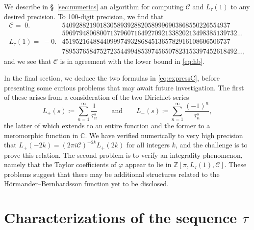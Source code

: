 \documentclass[12pt]{amsart}
\theoremstyle{plain}
\numberwithin{equation}{section}
\theoremstyle{definition}
\newcommand{\Z}{\mathbb{Z}}
\newcommand{\Cone}{\mathscr{C}}
\begin{document}
We describe in \S~\ref{sec:numerics} an algorithm for computing $\Cone$ and $L_{\tau}(1)$ to any desired precision. To 100-digit precision, we find that 
\begin{equation} \label{eq:precise100}
\begin{aligned}
	\Cone =\;
	0.&5409288219018305893928820589996903868550226554937\\
	&596979480680071379607164927092133820213498385139732\ldots\\
	L_{\tau}(1) =\;
	{-}0.&4519521648844099974932868451365782916108606506737\\
	&789537658475272354499485397456507823153397452618492\ldots,
	\end{aligned}
\end{equation}
and we see that $\Cone$ is in agreement with the lower bound in \eqref{eq:hb}. 

In the final section, we deduce the two formulas in \eqref{eq:expressC}, before presenting some curious problems that may await future investigation. The first of these arises from a consideration of the two Dirichlet series
\[L_{+}(s) \coloneqq \sum_{n=1}^{\infty}\frac{1}{\tau_n^s}\qquad\mbox{and}\qquad L_{-}(s) \coloneqq  \sum_{n=1}^{\infty}\frac{(-1)^n}{\tau_n^s},\]
the latter of which extends to an entire function and the former to a meromorphic function in $\mathbb C$. We have verified numerically to very high precision that $L_{+}(-2k)=(2\pi i \Cone)^{-2k} L_+(2k)$ for all integers $k$, and the challenge is to prove this relation.  The second problem is to verify an integrality phenomenon, namely that the Taylor coefficients of $\varphi$ appear to lie in $\Z[\pi, L_{\tau}(1), \Cone]$. These problems suggest that there may be additional  structures related to the H\"ormander--Bernhardsson function yet to be disclosed.

\section{Characterizations of the sequence \texorpdfstring{$\tau$}{tau}}
\label{sec:quaddiffeq}
\end{document}
